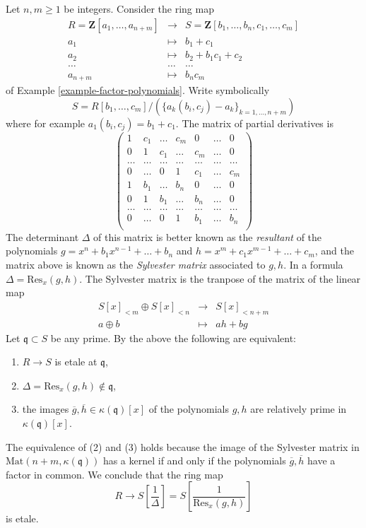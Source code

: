 \begin{example}
\label{example-factor-polynomials-etale}
Let $n , m \geq 1$ be integers. Consider the ring map
\begin{eqnarray*}
R = \mathbf{Z}[a_1, \ldots, a_{n + m}]
& \longrightarrow &
S = \mathbf{Z}[b_1, \ldots, b_n, c_1, \ldots, c_m] \\
a_1 & \longmapsto & b_1 + c_1 \\
a_2 & \longmapsto & b_2 + b_1 c_1 + c_2 \\
\ldots & \ldots & \ldots \\
a_{n + m} & \longmapsto & b_n c_m
\end{eqnarray*}
of Example \ref{example-factor-polynomials}.
Write symbolically
$$
S = R[b_1, \ldots, c_m]/(\{a_k(b_i, c_j) - a_k\}_{k = 1, \ldots, n + m})
$$
where for example $a_1(b_i, c_j) = b_1 + c_1$.
The matrix of partial derivatives is
$$
\left(
\begin{matrix}
1 & c_1 & \ldots & c_m & 0 & \ldots & 0 \\
0 & 1 & c_1 & \ldots & c_m & \ldots & 0 \\
\ldots & \ldots & \ldots & \ldots & \ldots & \ldots & \ldots \\
0 & \ldots & 0 & 1 & c_1 & \ldots & c_m \\
1 & b_1 & \ldots & b_n & 0 & \ldots & 0 \\
0 & 1 & b_1 & \ldots & b_n & \ldots & 0 \\
\ldots & \ldots & \ldots & \ldots & \ldots & \ldots & \ldots \\
0 & \ldots & 0 & 1 & b_1 & \ldots & b_n \\
\end{matrix}
\right)
$$
The determinant $\Delta$ of this matrix is better known as the
{\it resultant} of the polynomials $g = x^n + b_1 x^{n - 1} + \ldots + b_n$
and $h = x^m + c_1 x^{m - 1} + \ldots + c_m$, and the matrix above
is known as the {\it Sylvester matrix} associated to $g, h$.
In a formula $\Delta = \text{Res}_x(g, h)$. The Sylvester matrix
is the tranpose of the matrix of the linear map
\begin{eqnarray*}
S[x]_{< m} \oplus S[x]_{< n} & \longrightarrow & S[x]_{< n + m} \\
a \oplus b & \longmapsto & ah + bg
\end{eqnarray*}
Let $\mathfrak q \subset S$ be any prime. By the above the
following are equivalent:
\begin{enumerate}
\item $R \to S$ is etale at $\mathfrak q$,
\item $\Delta = \text{Res}_x(g, h) \not \in \mathfrak q$,
\item the images $\overline{g}, \overline{h} \in \kappa(\mathfrak q)[x]$
of the polynomials $g, h$ are relatively prime in $\kappa(\mathfrak q)[x]$.
\end{enumerate}
The equivalence of (2) and (3) holds because the image of the
Sylvester matrix in $\text{Mat}(n + m, \kappa(\mathfrak q))$
has a kernel if and only if the polynomials $\overline{g}, \overline{h}$
have a factor in common. We conclude that the ring map
$$
R \longrightarrow S[\frac{1}{\Delta}] = S[\frac{1}{\text{Res}_x(g, h)}]
$$
is etale.
\end{example}


